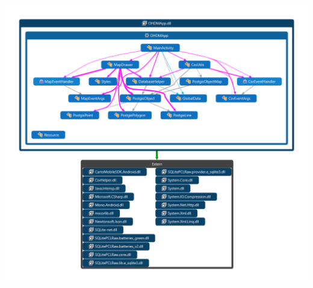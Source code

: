\hspace*{-3em}
\includegraphics*[width=1.3\linewidth,natwidth=1137,natheight=1042]{offlinemaps/bilder/komponentendiagramm.png}

